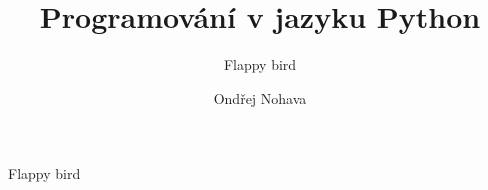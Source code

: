 \documentclass{beamer}
\title{Programování v jazyku Python}
\subtitle{Flappy bird}
\author{Ondřej Nohava}
\institute[DDMJH]{Dům dětí a mládeže Jindřichův Hradec}
\date{}
\begin{document}
\begin{frame}
\titlepage
\end{frame}

\begin{frame}[t]{Flappy bird}


\end{frame}
\end{document}

